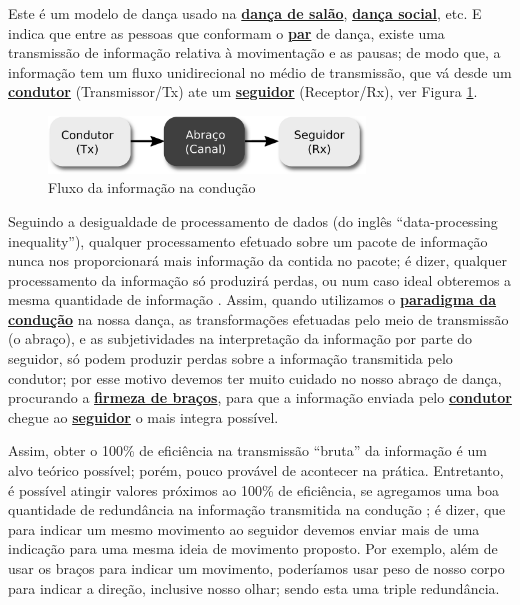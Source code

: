 \begin{definition} 
\label{def:ParadigmaConducao} 
Este é um modelo de dança usado na \hyperref[def:DancaSalao]{\textbf{dança de salão}},
\hyperref[def:DancaSocial]{\textbf{dança social}}, etc. 
E indica que entre as pessoas que conformam o \hyperref[def:Par]{\textbf{par}} de dança,
existe uma transmissão de informação relativa à movimentação e as pausas; 
de modo que, a informação tem um fluxo unidirecional no médio de transmissão,
que vá desde um \hyperref[def:Condutor]{\textbf{condutor}} (Transmissor/Tx) 
ate um \hyperref[def:Seguidor]{\textbf{seguidor}} (Receptor/Rx),
ver Figura \ref{fig:paradigmaconducion}. 
\end{definition}

\begin{figure}[!ht]
     \centering
\includegraphics[width=0.75\textwidth]{chapters/cap-normas/modeloconducao.eps}
\caption{Fluxo da informação na condução}
\label{fig:paradigmaconducion}
\end{figure}

Seguindo a desigualdade de processamento de dados (do inglês ``data-processing inequality''),
qualquer processamento efetuado sobre um pacote de informação 
nunca nos proporcionará mais informação da contida no pacote;
é dizer, qualquer processamento da informação só produzirá perdas,
ou num caso ideal obteremos a mesma quantidade de informação  \cite[pp. 34]{cover2006elements}.
Assim, quando utilizamos o \hyperref[def:ParadigmaConducao]{\textbf{paradigma da condução}} na nossa dança,
as transformações efetuadas pelo meio de transmissão (o abraço),
e as subjetividades na interpretação da informação por parte do seguidor, 
só podem produzir perdas sobre a informação transmitida pelo condutor;
por esse motivo devemos ter muito cuidado no nosso abraço de dança,
procurando a \hyperref[def:brazosfirmes]{\textbf{firmeza de braços}}, 
para que a informação enviada pelo \hyperref[def:Condutor]{\textbf{condutor}} 
chegue ao \hyperref[def:Seguidor]{\textbf{seguidor}} o mais integra possível.

Assim, obter o 100\% de eficiência na transmissão ``bruta'' da informação
é  um alvo teórico possível; porém, pouco provável de acontecer na prática.
Entretanto, é possível atingir valores próximos ao 100\% de eficiência,
se agregamos uma boa quantidade de redundância na informação transmitida na condução \cite[pp. 184,219]{cover2006elements};
é dizer, que para indicar um mesmo movimento ao seguidor devemos enviar mais de uma indicação 
para uma mesma ideia de movimento proposto. Por exemplo, 
além de usar os braços para indicar um movimento, 
poderíamos usar peso de nosso corpo para indicar a direção, inclusive nosso olhar;
sendo esta uma triple redundância.
 

